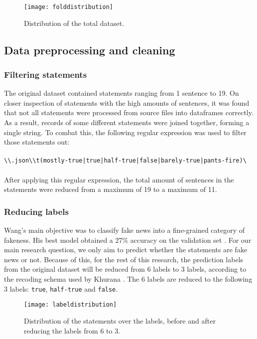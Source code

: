 \begin{figure}[h]
    \centering
    \texttt{[image: folddistribution]}
    \caption{Distribution of the total dataset.}
\end{figure}

\subsection{Data preprocessing and cleaning}
\subsubsection{Filtering statements}
The original dataset contained statements ranging from 1 sentence to 19. 
On closer inspection of statements with the high amounts of sentences, it was found that not all statements were processed from source files into dataframes correctly.
As a result, records of some different statements were joined together, forming a single string.
To combat this, the following regular expression was used to filter those statements out:\\
\\
\verb/\\.json\\t(mostly-true|true|half-true|false|barely-true|pants-fire)\/\\
\\
After applying this regular expression, the total amount of sentences in the statements were reduced from a maximum of 19 to a maximum of 11. 

\subsubsection{Reducing labels}

Wang's main objective was to classify fake news into a fine-grained category of fakeness. 
His best model obtained a 27\% accuracy on the validation set \cite{wang2018}.
For our main research question, we only aim to predict whether the statements are fake news or not. 
Because of this, for the rest of this research, the prediction labels from the original dataset will be reduced from 6 labels to 3 labels, according to the recoding schema used by Khurana \cite{khurana2017}.
The 6 labels are reduced to the following 3 labels: \texttt{true}, \texttt{half-true} and \texttt{false}.

\begin{figure}[h]
    \centering
    \texttt{[image: labeldistribution]}
    \caption{Distribution of the statements over the labels, before and after reducing the labels from 6 to 3.}
\end{figure}


